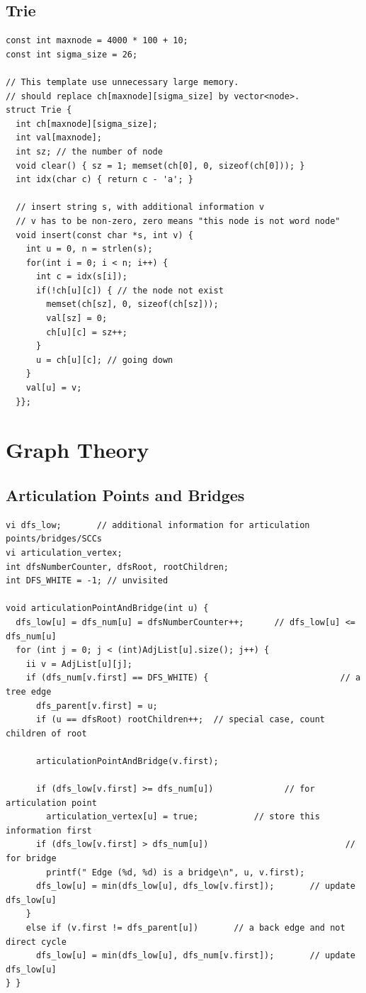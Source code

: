 \documentclass[10pt,landscape]{article}
\begin{document}
\begin{multicols}{2}
\subsection{Trie}
\begin{lstlisting}
const int maxnode = 4000 * 100 + 10;
const int sigma_size = 26;

// This template use unnecessary large memory.
// should replace ch[maxnode][sigma_size] by vector<node>.
struct Trie {
  int ch[maxnode][sigma_size];
  int val[maxnode];
  int sz; // the number of node
  void clear() { sz = 1; memset(ch[0], 0, sizeof(ch[0])); }
  int idx(char c) { return c - 'a'; }

  // insert string s, with additional information v
  // v has to be non-zero, zero means "this node is not word node" 
  void insert(const char *s, int v) {
    int u = 0, n = strlen(s);
    for(int i = 0; i < n; i++) {
      int c = idx(s[i]);
      if(!ch[u][c]) { // the node not exist
        memset(ch[sz], 0, sizeof(ch[sz]));
        val[sz] = 0;
        ch[u][c] = sz++;
      }
      u = ch[u][c]; // going down
    }
    val[u] = v;
  }};
\end{lstlisting}

\section{Graph Theory}
\subsection{Articulation Points and Bridges}
\begin{lstlisting}
vi dfs_low;       // additional information for articulation points/bridges/SCCs
vi articulation_vertex;
int dfsNumberCounter, dfsRoot, rootChildren;
int DFS_WHITE = -1; // unvisited

void articulationPointAndBridge(int u) {
  dfs_low[u] = dfs_num[u] = dfsNumberCounter++;      // dfs_low[u] <= dfs_num[u]
  for (int j = 0; j < (int)AdjList[u].size(); j++) {
    ii v = AdjList[u][j];
    if (dfs_num[v.first] == DFS_WHITE) {                          // a tree edge
      dfs_parent[v.first] = u;
      if (u == dfsRoot) rootChildren++;  // special case, count children of root

      articulationPointAndBridge(v.first);

      if (dfs_low[v.first] >= dfs_num[u])              // for articulation point
        articulation_vertex[u] = true;           // store this information first
      if (dfs_low[v.first] > dfs_num[u])                           // for bridge
        printf(" Edge (%d, %d) is a bridge\n", u, v.first);
      dfs_low[u] = min(dfs_low[u], dfs_low[v.first]);       // update dfs_low[u]
    }
    else if (v.first != dfs_parent[u])       // a back edge and not direct cycle
      dfs_low[u] = min(dfs_low[u], dfs_num[v.first]);       // update dfs_low[u]
} }


\end{lstlisting}
\end{multicols}
\end{document}

